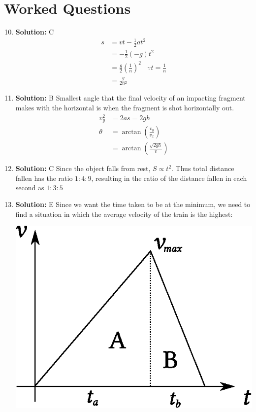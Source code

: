 \documentclass[11pt]{article}
\newenvironment{multicolFigure}
{\par\medskip\noindent\minipage{\linewidth}}
{\endminipage\par\medskip}
\newcommand{\solution}[1]{\textbf{Solution: } #1 \hspace{5mm}}
\begin{document}
	\section*{Worked Questions}
	\begin{multicols}{2}
		\begin{enumerate}
			\setcounter{enumi}{9}
			\item \solution{C}
			\begin{align*}
				s &= vt - \frac{1}{2}at^2 \\
				&= - \frac{1}{2}(-g)t^2 \\
				&= \frac{g}{2}\left(\frac{1}{n}\right)^2 ~~~~\because t=\frac{1}{n} \\
				&= \frac{g}{2n^2}
			\end{align*}
			\item \solution{B} Smallest angle that the final velocity of an impacting fragment makes with the horizontal is when the fragment is shot horizontally out.
			\begin{align*}
				v_y^2 &= 2as = 2gh\\
				\theta &= \arctan\left(\frac{v_y}{v_x}\right) \\
				&= \arctan\left(\frac{\sqrt{2gh}}{v}\right)
			\end{align*}
			\columnbreak
			\item \solution{C} Since the object falls from rest, $S \propto t^2$. Thus total distance fallen has the ratio $1:4:9$, resulting in the ratio of the distance fallen in each second as $1:3:5$
			\item \solution{E} Since we want the time taken to be at the minimum, we need to find a situation in which the average velocity of the train is the highest:
			\begin{multicolFigure}
				\centering
				\includegraphics[width=0.60\linewidth]{train.eps}
			\end{multicolFigure}
			\begin{align*}

\end{align*}
\end{enumerate}
\end{multicols}
\end{document}
